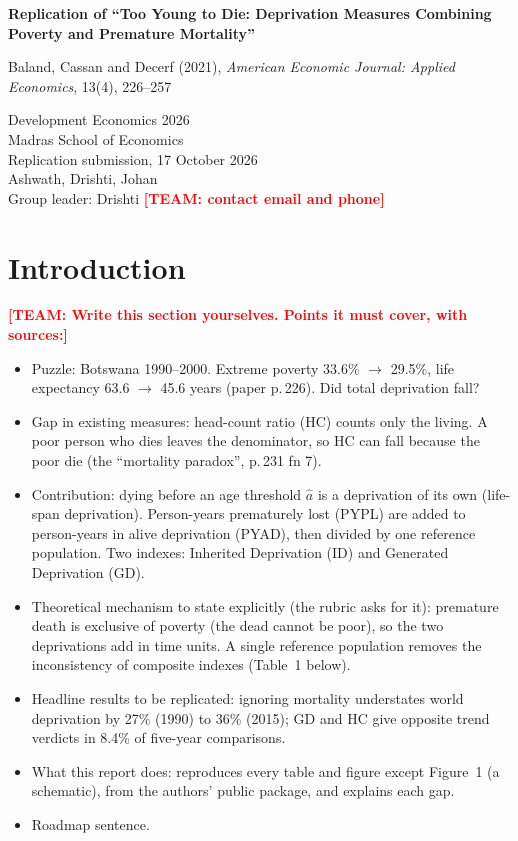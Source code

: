 \documentclass[12pt,a4paper]{article}
\newcommand{\todo}[1]{\textbf{\textcolor{red}{[TEAM: #1]}}}
\newcommand{\ahat}{\hat{a}}
\begin{document}
\begin{titlepage}
\centering
\vspace*{3cm}
{\Large\bfseries Replication of ``Too Young to Die: Deprivation Measures Combining Poverty and Premature Mortality''\par}
\vspace{1cm}
{\large Baland, Cassan and Decerf (2021), \emph{American Economic Journal: Applied Economics}, 13(4), 226--257\par}
\vspace{2cm}
Development Economics 2026\\ Madras School of Economics\\[1em]
Replication submission, 17 October 2026\\[2em]
Ashwath, Drishti, Johan\\[0.5em]
Group leader: Drishti \todo{contact email and phone}
\end{titlepage}

\section{Introduction}
\todo{Write this section yourselves. Points it must cover, with sources:}
\begin{itemize}
  \item Puzzle: Botswana 1990--2000. Extreme poverty 33.6\% $\to$ 29.5\%, life expectancy 63.6 $\to$ 45.6 years (paper p.\,226). Did total deprivation fall?
  \item Gap in existing measures: head-count ratio (HC) counts only the living. A poor person who dies leaves the denominator, so HC can fall because the poor die (the ``mortality paradox'', p.\,231 fn 7).
  \item Contribution: dying before an age threshold $\ahat$ is a deprivation of its own (life-span deprivation). Person-years prematurely lost (PYPL) are added to person-years in alive deprivation (PYAD), then divided by one reference population. Two indexes: Inherited Deprivation (ID) and Generated Deprivation (GD).
  \item Theoretical mechanism to state explicitly (the rubric asks for it): premature death is exclusive of poverty (the dead cannot be poor), so the two deprivations add in time units. A single reference population removes the inconsistency of composite indexes (Table~1 below).
  \item Headline results to be replicated: ignoring mortality understates world deprivation by 27\% (1990) to 36\% (2015); GD and HC give opposite trend verdicts in 8.4\% of five-year comparisons.
  \item What this report does: reproduces every table and figure except Figure~1 (a schematic), from the authors' public package, and explains each gap.
  \item Roadmap sentence.
\end{itemize}
\end{document}
